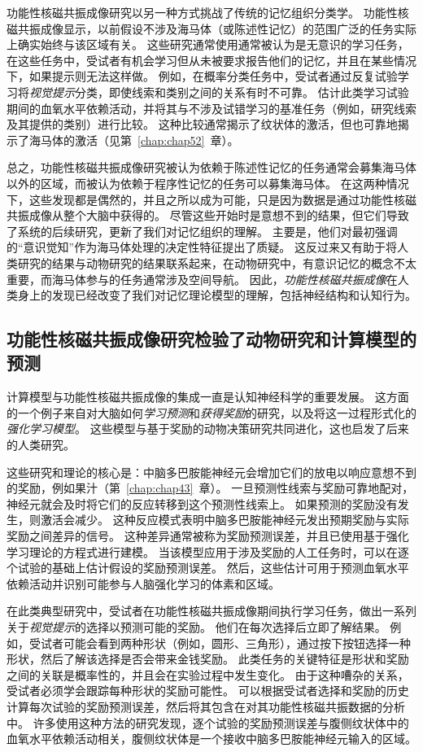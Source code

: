 功能性核磁共振成像研究以另一种方式挑战了传统的记忆组织分类学。
功能性核磁共振成像显示，以前假设不涉及海马体（或陈述性记忆）的范围广泛的任务实际上确实始终与该区域有关。
这些研究通常使用通常被认为是无意识的学习任务，在这些任务中，受试者有机会学习但从未被要求报告他们的记忆，并且在某些情况下，如果提示则无法这样做。
例如，在概率分类任务中，受试者通过反复试验学习将\textit{视觉提示}分类，即使线索和类别之间的关系有时不可靠。
估计此类学习试验期间的血氧水平依赖活动，并将其与不涉及试错学习的基准任务（例如，研究线索及其提供的类别）进行比较。
这种比较通常揭示了纹状体的激活，但也可靠地揭示了海马体的激活（见第~\ref{chap:chap52}~章）。


总之，功能性核磁共振成像研究被认为依赖于陈述性记忆的任务通常会募集海马体以外的区域，而被认为依赖于程序性记忆的任务可以募集海马体。
在这两种情况下，这些发现都是偶然的，并且之所以成为可能，只是因为数据是通过功能性核磁共振成像从整个大脑中获得的。
尽管这些开始时是意想不到的结果，但它们导致了系统的后续研究，更新了我们对记忆组织的理解。
主要是，他们对最初强调的“意识觉知”作为海马体处理的决定性特征提出了质疑。
这反过来又有助于将人类研究的结果与动物研究的结果联系起来，在动物研究中，有意识记忆的概念不太重要，而海马体参与的任务通常涉及空间导航。
因此，\textit{功能性核磁共振成像}在人类身上的发现已经改变了我们对记忆理论模型的理解，包括神经结构和认知行为。



\subsection{功能性核磁共振成像研究检验了动物研究和计算模型的预测}

计算模型与功能性核磁共振成像的集成一直是认知神经科学的重要发展。
这方面的一个例子来自对大脑如何\textit{学习预测}和\textit{获得奖励}的研究，以及将这一过程形式化的\textit{强化学习模型}。
这些模型与基于奖励的动物决策研究共同进化，这也启发了后来的人类研究。


这些研究和理论的核心是：中脑多巴胺能神经元会增加它们的放电以响应意想不到的奖励，例如果汁（第~\ref{chap:chap43}~章）。 
一旦预测性线索与奖励可靠地配对，神经元就会及时将它们的反应转移到这个预测性线索上。
如果预测的奖励没有发生，则激活会减少。
这种反应模式表明中脑多巴胺能神经元发出预期奖励与实际奖励之间差异的信号。
这种差异通常被称为奖励预测误差，并且已使用基于强化学习理论的方程式进行建模。
当该模型应用于涉及奖励的人工任务时，可以在逐个试验的基础上估计假设的奖励预测误差。
然后，这些估计可用于预测血氧水平依赖活动并识别可能参与人脑强化学习的体素和区域。


在此类典型研究中，受试者在功能性核磁共振成像期间执行学习任务，做出一系列关于\textit{视觉提示}的选择以预测可能的奖励。
他们在每次选择后立即了解结果。
例如，受试者可能会看到两种形状（例如，圆形、三角形），通过按下按钮选择一种形状，然后了解该选择是否会带来金钱奖励。
此类任务的关键特征是形状和奖励之间的关联是概率性的，并且会在实验过程中发生变化。
由于这种嘈杂的关系，受试者必须学会跟踪每种形状的奖励可能性。
可以根据受试者选择和奖励的历史计算每次试验的奖励预测误差，然后将其包含在对其功能性核磁共振数据的分析中。
许多使用这种方法的研究发现，逐个试验的奖励预测误差与腹侧纹状体中的血氧水平依赖活动相关，腹侧纹状体是一个接收中脑多巴胺能神经元输入的区域。


